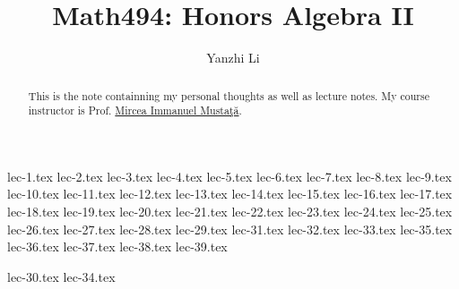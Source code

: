 \documentclass[a4paper]{report}
\author{Yanzhi Li}
\title{Math494: Honors Algebra II}
\begin{document}
\maketitle

\begin{abstract}
	This is the note containning my personal thoughts as well as lecture notes. My course instructor is Prof. \href{https://websites.umich.edu/~mmustata/}{Mircea Immanuel Musta\c{t}\u{a}}.
\end{abstract}

\newpage

\tableofcontents

{lec-1.tex}
{lec-2.tex}
{lec-3.tex}
{lec-4.tex}
{lec-5.tex}
{lec-6.tex}
{lec-7.tex}
{lec-8.tex}
{lec-9.tex}
{lec-10.tex}
{lec-11.tex}
{lec-12.tex}
{lec-13.tex}
{lec-14.tex}
{lec-15.tex}
{lec-16.tex}
{lec-17.tex}
{lec-18.tex}
{lec-19.tex}
{lec-20.tex}
{lec-21.tex}
{lec-22.tex}
{lec-23.tex}
{lec-24.tex}
{lec-25.tex}
{lec-26.tex}
{lec-27.tex}
{lec-28.tex}
{lec-29.tex}
{lec-31.tex}
{lec-32.tex}
{lec-33.tex}
{lec-35.tex}
{lec-36.tex}
{lec-37.tex}
{lec-38.tex}
{lec-39.tex}

{lec-30.tex}
{lec-34.tex}

\newpage

%

\newpage
\end{document}
